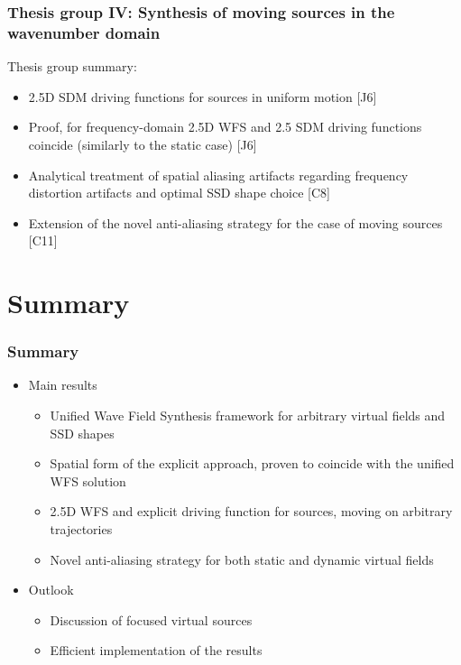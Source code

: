 \documentclass{beamer}
\begin{document}
\begin{frame}
\frametitle{Thesis group IV: Synthesis of moving sources in the wavenumber domain}
Thesis group summary:
	\vspace{3mm}	
	\begin{itemize}
	\item 2.5D SDM driving functions for sources in uniform motion [J6]
	\vspace{3mm}	
	\item Proof, for frequency-domain 2.5D WFS and 2.5 SDM driving functions coincide (similarly to the static case) [J6]
	\vspace{3mm}	
	\item Analytical treatment of spatial aliasing artifacts regarding frequency distortion artifacts and optimal SSD shape choice [C8]
	\vspace{3mm}	
	\item Extension of the novel anti-aliasing strategy for the case of moving sources [C11]
	\end{itemize}
\end{frame}

\section{Summary}
\begin{frame}
\frametitle{Summary}
\begin{itemize}
\item Main results
	\vspace{3mm}	
	\begin{itemize}
	\item Unified Wave Field Synthesis framework for arbitrary virtual fields and SSD shapes	\vspace{3mm}	
	\item Spatial form of the explicit approach, proven to coincide with the unified WFS solution 	\vspace{3mm}	
	\item 2.5D WFS and explicit driving function for sources, moving on arbitrary trajectories 	\vspace{3mm}	
	\item Novel anti-aliasing strategy for both static and dynamic virtual fields
	\end{itemize}
	\vspace{3mm}
\item Outlook
	\begin{itemize}
	\item Discussion of focused virtual sources	\vspace{3mm}	
	\item Efficient implementation of the results
	\end{itemize}
\end{itemize}
\end{frame}
\end{document}
